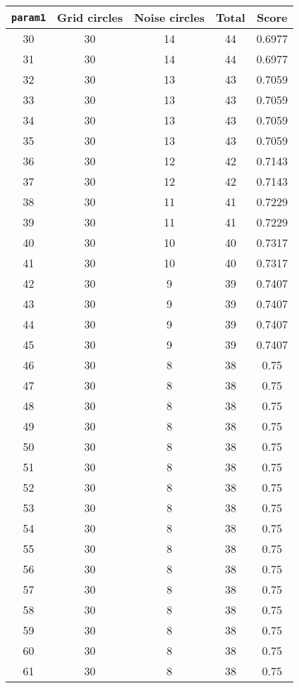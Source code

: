 \documentclass[letterpaper, 12pt]{article}
\begin{document}
\begin{longtable}{|c|c|c|c|c|}
\hline
\textbf{\texttt{param1}} & \textbf{Grid circles} & \textbf{Noise circles} & \textbf{Total} & \textbf{Score} \\
\hline
30 & 30 & 14 & 44 & 0.6977 \\
\hline
31 & 30 & 14 & 44 & 0.6977 \\
\hline
32 & 30 & 13 & 43 & 0.7059 \\
\hline
33 & 30 & 13 & 43 & 0.7059 \\
\hline
34 & 30 & 13 & 43 & 0.7059 \\
\hline
35 & 30 & 13 & 43 & 0.7059 \\
\hline
36 & 30 & 12 & 42 & 0.7143 \\
\hline
37 & 30 & 12 & 42 & 0.7143 \\
\hline
38 & 30 & 11 & 41 & 0.7229 \\
\hline
39 & 30 & 11 & 41 & 0.7229 \\
\hline
40 & 30 & 10 & 40 & 0.7317 \\
\hline
41 & 30 & 10 & 40 & 0.7317 \\
\hline
42 & 30 & 9 & 39 & 0.7407 \\
\hline
43 & 30 & 9 & 39 & 0.7407 \\
\hline
44 & 30 & 9 & 39 & 0.7407 \\
\hline
45 & 30 & 9 & 39 & 0.7407 \\
\hline
46 & 30 & 8 & 38 & 0.75 \\
\hline
47 & 30 & 8 & 38 & 0.75 \\
\hline
48 & 30 & 8 & 38 & 0.75 \\
\hline
49 & 30 & 8 & 38 & 0.75 \\
\hline
50 & 30 & 8 & 38 & 0.75 \\
\hline
51 & 30 & 8 & 38 & 0.75 \\
\hline
52 & 30 & 8 & 38 & 0.75 \\
\hline
53 & 30 & 8 & 38 & 0.75 \\
\hline
54 & 30 & 8 & 38 & 0.75 \\
\hline
55 & 30 & 8 & 38 & 0.75 \\
\hline
56 & 30 & 8 & 38 & 0.75 \\
\hline
57 & 30 & 8 & 38 & 0.75 \\
\hline
58 & 30 & 8 & 38 & 0.75 \\
\hline
59 & 30 & 8 & 38 & 0.75 \\
\hline
60 & 30 & 8 & 38 & 0.75 \\
\hline
61 & 30 & 8 & 38 & 0.75 \\

\end{longtable}
\end{document}
